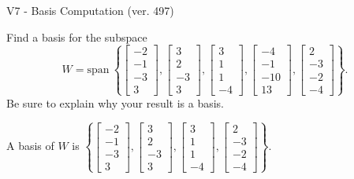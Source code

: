 \begin{exercise}
  \begin{exerciseTitle}V7 - Basis Computation (ver. 497)\end{exerciseTitle}
  \begin{exerciseStatement}
    Find a basis for the subspace 
\[W=\mathrm{span}\ \left\{\left[\begin{array}{r}
-2 \\
-1 \\
-3 \\
3
\end{array}\right] , \left[\begin{array}{r}
3 \\
2 \\
-3 \\
3
\end{array}\right] , \left[\begin{array}{r}
3 \\
1 \\
1 \\
-4
\end{array}\right] , \left[\begin{array}{r}
-4 \\
-1 \\
-10 \\
13
\end{array}\right] , \left[\begin{array}{r}
2 \\
-3 \\
-2 \\
-4
\end{array}\right]\right\}.\]
 Be sure to explain why your result is a basis.


  \end{exerciseStatement}
  \begin{exerciseAnswer}
   A basis of \(W\) is  \(\left\{\left[\begin{array}{r}
-2 \\
-1 \\
-3 \\
3
\end{array}\right] , \left[\begin{array}{r}
3 \\
2 \\
-3 \\
3
\end{array}\right] , \left[\begin{array}{r}
3 \\
1 \\
1 \\
-4
\end{array}\right] , \left[\begin{array}{r}
2 \\
-3 \\
-2 \\
-4
\end{array}\right]\right\}\).
  


  \end{exerciseAnswer}
\end{exercise}